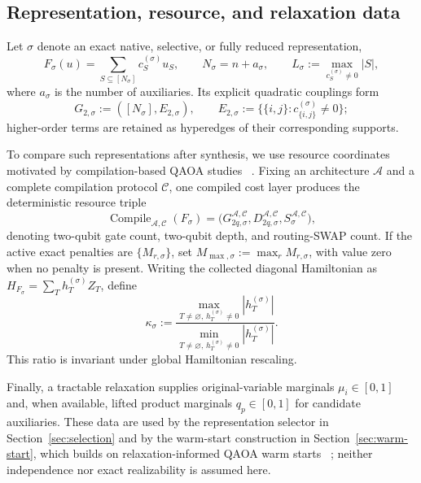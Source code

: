 \documentclass[a4paper,onecolumn,11pt,unpublished]{quantumarticle}
\theoremstyle{remark}
\begin{document}
\subsection{Representation, resource, and relaxation data}
\label{sec:resource-relaxation-data}

Let \(\sigma\) denote an exact native, selective, or fully reduced
representation,
\begin{equation}
  F_\sigma(u)=\sum_{S\subseteq[N_\sigma]}c_S^{(\sigma)}u_S,
  \qquad
  N_\sigma=n+a_\sigma,
  \qquad
  L_\sigma:=\max_{c_S^{(\sigma)}\neq0}|S|,
  \label{eq:representation-data}
\end{equation}
where \(a_\sigma\) is the number of auxiliaries.  Its explicit quadratic
couplings form
\begin{equation}
  G_{2,\sigma}:=([N_\sigma],E_{2,\sigma}),
  \qquad
  E_{2,\sigma}:=
  \bigl\{\{i,j\}:c_{\{i,j\}}^{(\sigma)}\neq0\bigr\};
  \label{eq:quadratic-graph}
\end{equation}
higher-order terms are retained as hyperedges of their corresponding supports.

To compare such representations after synthesis, we use resource coordinates
motivated by compilation-based QAOA studies
~\cite{Weidenfeller2022,Schmidbauer2024,Rovara2026}.
Fixing an architecture \(\mathcal{A}\) and a complete compilation protocol
\(\mathcal{C}\), one compiled cost layer produces the deterministic resource
triple
\begin{equation}
  \operatorname{Compile}_{\mathcal A,\mathcal C}(F_\sigma)
  =\bigl(G_{2q,\sigma}^{\mathcal A,\mathcal C},
         D_{2q,\sigma}^{\mathcal A,\mathcal C},
         S_\sigma^{\mathcal A,\mathcal C}\bigr),
  \label{eq:compiled-resources}
\end{equation}
denoting two-qubit gate count, two-qubit depth, and routing-SWAP count.  If the
active exact penalties are \(\{M_{r,\sigma}\}\), set
\(M_{\max,\sigma}:=\max_r M_{r,\sigma}\), with value zero when no penalty is
present.  Writing the collected diagonal Hamiltonian as
\(H_{F_\sigma}=\sum_T h_T^{(\sigma)}Z_T\), define
\begin{equation}
  \kappa_\sigma:=
  \frac{\max_{T\neq\varnothing,\,h_T^{(\sigma)}\neq0}|h_T^{(\sigma)}|}
       {\min_{T\neq\varnothing,\,h_T^{(\sigma)}\neq0}|h_T^{(\sigma)}|}.
  \label{eq:pauli-dynamic-range}
\end{equation}
This ratio is invariant under global Hamiltonian rescaling.

Finally, a tractable relaxation supplies original-variable marginals
\(\mu_i\in[0,1]\) and, when available, lifted product marginals
\(q_p\in[0,1]\) for candidate auxiliaries.  These data are used by the
representation selector in Section~\ref{sec:selection} and by the warm-start
construction in Section~\ref{sec:warm-start}, which builds on
relaxation-informed QAOA warm starts
~\cite{Egger2021,TateSDP2023,TateCustom2023}; neither independence nor exact
realizability is assumed here.
\end{document}
